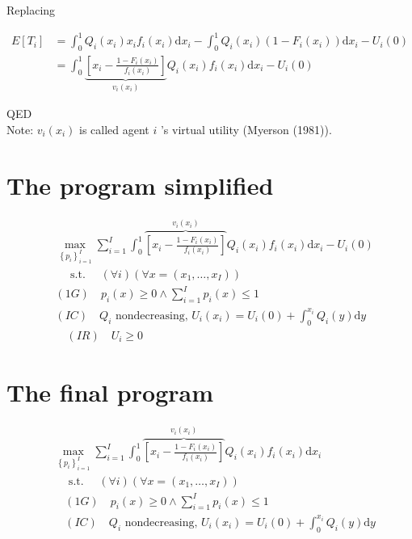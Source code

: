 \documentclass[10pt]{article}
\begin{document}
Replacing

$$
\begin{aligned}
E\left[T_{i}\right] & =\int_{0}^{1} Q_{i}\left(x_{i}\right) x_{i} f_{i}\left(x_{i}\right) \mathrm{d} x_{i}-\int_{0}^{1} Q_{i}\left(x_{i}\right)\left(1-F_{i}\left(x_{i}\right)\right) \mathrm{d} x_{i}-U_{i}(0) \\
& =\int_{0}^{1} \underbrace{\left[x_{i}-\frac{1-F_{i}\left(x_{i}\right)}{f_{i}\left(x_{i}\right)}\right]}_{v_{i}\left(x_{i}\right)} Q_{i}\left(x_{i}\right) f_{i}\left(x_{i}\right) \mathrm{d} x_{i}-U_{i}(0)
\end{aligned}
$$

QED\\
Note: $v_{i}\left(x_{i}\right)$ is called agent $i$ 's virtual utility (Myerson (1981)).

\section*{The program simplified}
$$
\begin{aligned}
& \max _{\left\{p_{i}\right\}_{i=1}^{I}} \sum_{i=1}^{I} \int_{0}^{1} \overbrace{\left[x_{i}-\frac{1-F_{i}\left(x_{i}\right)}{f_{i}\left(x_{i}\right)}\right]}^{v_{i}\left(x_{i}\right)} Q_{i}\left(x_{i}\right) f_{i}\left(x_{i}\right) \mathrm{d} x_{i}-U_{i}(0) \\
& \quad \text { s.t. } \quad(\forall i)\left(\forall x=\left(x_{1}, \ldots, x_{I}\right)\right) \\
& (1 G) \quad p_{i}(x) \geq 0 \wedge \sum_{i=1}^{I} p_{i}(x) \leq 1 \\
& (I C) \quad Q_{i} \text { nondecreasing, } U_{i}\left(x_{i}\right)=U_{i}(0)+\int_{0}^{x_{i}} Q_{i}(y) \mathrm{d} y \\
& \quad(I R) \quad U_{i} \geq 0
\end{aligned}
$$

\section*{The final program}
$$
\begin{aligned}
& \max _{\left\{p_{i}\right\}_{i=1}^{I}} \sum_{i=1}^{I} \int_{0}^{1} \overbrace{\left[x_{i}-\frac{1-F_{i}\left(x_{i}\right)}{f_{i}\left(x_{i}\right)}\right]}^{v_{i}\left(x_{i}\right)} Q_{i}\left(x_{i}\right) f_{i}\left(x_{i}\right) \mathrm{d} x_{i} \\
& \quad \text { s.t. } \quad(\forall i)\left(\forall x=\left(x_{1}, \ldots, x_{I}\right)\right) \\
& \quad(1 G) \quad p_{i}(x) \geq 0 \wedge \sum_{i=1}^{I} p_{i}(x) \leq 1 \\
& \quad(I C) \quad Q_{i} \text { nondecreasing, } U_{i}\left(x_{i}\right)=U_{i}(0)+\int_{0}^{x_{i}} Q_{i}(y) \mathrm{d} y
\end{aligned}
$$
\end{document}

